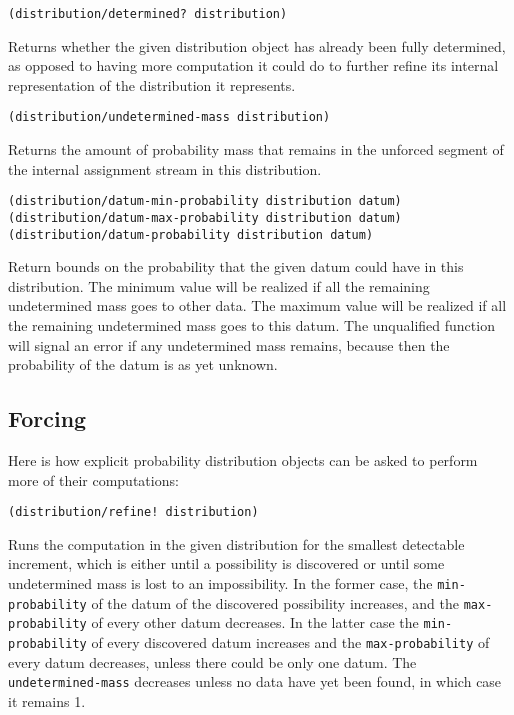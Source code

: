\documentclass[12pt]{article}
\newcommand{\code}[1]{\texttt{#1}}
\begin{document}
\begin{verbatim}
(distribution/determined? distribution)
\end{verbatim}

Returns whether the given distribution object has already been fully
determined, as opposed to having more computation it could do to
further refine its internal representation of the distribution it
represents.

\begin{verbatim}
(distribution/undetermined-mass distribution)
\end{verbatim}

Returns the amount of probability mass that remains in the unforced
segment of the internal assignment stream in this distribution.

\begin{verbatim}
(distribution/datum-min-probability distribution datum)
(distribution/datum-max-probability distribution datum)
(distribution/datum-probability distribution datum)
\end{verbatim}

Return bounds on the probability that the given datum could have in
this distribution.  The minimum value will be realized if all the
remaining undetermined mass goes to other data.  The maximum value
will be realized if all the remaining undetermined mass goes to this
datum.  The unqualified function will signal an error if any 
undetermined mass remains, because then the probability of the 
datum is as yet unknown.

\subsection{Forcing}

Here is how explicit probability distribution objects can be asked to
perform more of their computations:

\begin{verbatim}
(distribution/refine! distribution)
\end{verbatim}

Runs the computation in the given distribution for the smallest
detectable increment, which is either until a possibility is
discovered or until some undetermined mass is lost to an
impossibility.  In the former case, the \code{min-probability} of the
datum of the discovered possibility increases, and the
\code{max-probability} of every other datum decreases.  In the latter
case the \code{min-probability} of every discovered datum increases
and the \code{max-probability} of every datum decreases, unless there
could be only one datum.  The \code{undetermined-mass} decreases
unless no data have yet been found, in which case it remains 1.
\end{document}
